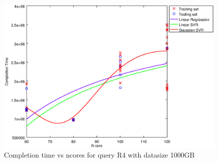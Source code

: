 
\begin {figure}[hbtp]
\centering
\includegraphics[width=\textwidth]{output/R4_1000_ONLY_1_OVER_NCORES/plot_R4_1000_bestmodels.eps}
\caption{Completion time vs ncores for query R4 with datasize 1000GB}
\label{fig:all_nonlinear_R4_1000}
\end {figure}
